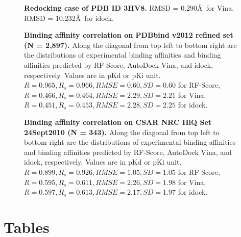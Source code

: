 \documentclass[10pt]{article}
\begin{document}
\begin{figure}[!ht]
\begin{center}
\end{center}
\caption{
{\bf Redocking case of PDB ID 3HV8.} RMSD = 0.290\AA\ for Vina. RMSD = 10.232\AA\ for idock.
}
\label{Redocking3HV8}
\end{figure}

\begin{figure}[!ht]
\begin{center}
\end{center}
\caption{
{\bf Binding affinity correlation on PDBbind v2012 refined set (N = 2,897).} Along the diagonal from top left to bottom right are the distributions of experimental binding affinities and binding affinities predicted by RF-Score, AutoDock Vina, and idock, respectively. Values are in pKd or pKi unit. $R = 0.965, R_s = 0.966, RMSE = 0.60, SD = 0.60$ for RF-Score, $R = 0.466, R_s = 0.464, RMSE = 2.29, SD = 2.21$ for Vina, $R = 0.451, R_s = 0.453, RMSE = 2.28, SD = 2.25$ for idock.
}
\label{PDBbind2012Correlation}
\end{figure}

\begin{figure}[!ht]
\begin{center}
\end{center}
\caption{
{\bf Binding affinity correlation on CSAR NRC HiQ Set 24Sept2010 (N = 343).} Along the diagonal from top left to bottom right are the distributions of experimental binding affinities and binding affinities predicted by RF-Score, AutoDock Vina, and idock, respectively. Values are in pKd or pKi unit. $R = 0.899, R_s = 0.926, RMSE = 1.05, SD = 1.05$ for RF-Score, $R = 0.595, R_s = 0.611, RMSE = 2.26, SD = 1.98$ for Vina, $R = 0.597, R_s = 0.613, RMSE = 2.17, SD = 1.97$ for idock.
}
\label{CSARCorrelation}
\end{figure}

\section*{Tables}
\end{document}
